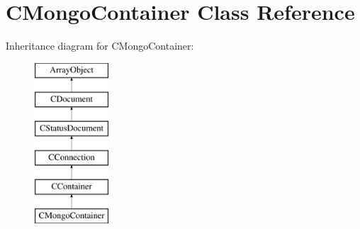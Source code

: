 \hypertarget{class_c_mongo_container}{\section{C\-Mongo\-Container Class Reference}
\label{class_c_mongo_container}
}
Inheritance diagram for C\-Mongo\-Container\-:\begin{figure}[H]
\begin{center}
\leavevmode
\includegraphics[height=6.000000cm]{class_c_mongo_container}
\end{center}
\end{figure}
